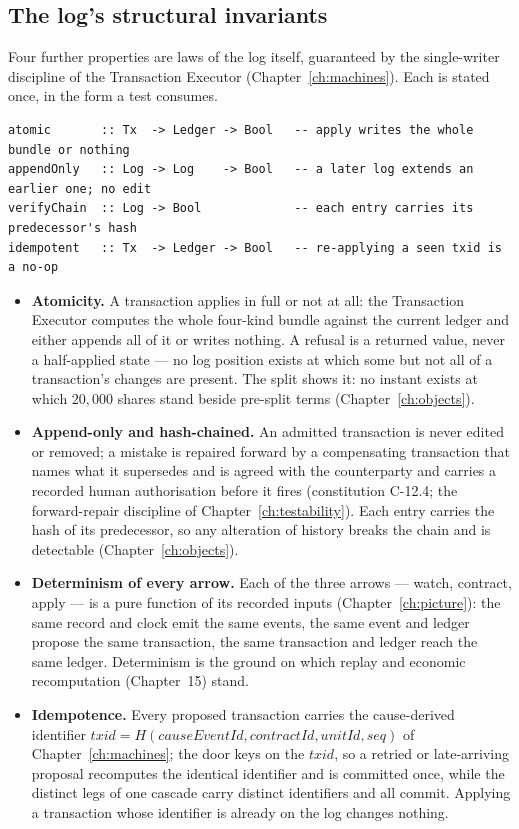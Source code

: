 \documentclass[11pt,a4paper]{article}
\begin{document}
\subsection{The log's structural invariants}

Four further properties are laws of the log itself, guaranteed by the
single-writer discipline of the Transaction Executor (Chapter~\ref{ch:machines}).
Each is stated once, in the form a test consumes.

\begin{lstlisting}
atomic       :: Tx  -> Ledger -> Bool   -- apply writes the whole bundle or nothing
appendOnly   :: Log -> Log    -> Bool   -- a later log extends an earlier one; no edit
verifyChain  :: Log -> Bool             -- each entry carries its predecessor's hash
idempotent   :: Tx  -> Ledger -> Bool   -- re-applying a seen txid is a no-op
\end{lstlisting}

\begin{itemize}[leftmargin=1.4em,itemsep=2pt]
\item \textbf{Atomicity.} A transaction applies in full or not at all: the
  Transaction Executor computes the whole four-kind bundle against the current
  ledger and either appends all of it or writes nothing. A refusal is a returned
  value, never a half-applied state --- no log position exists at which some but
  not all of a transaction's changes are present. The split shows it: no instant
  exists at which $20{,}000$ shares stand beside pre-split terms
  (Chapter~\ref{ch:objects}).
\item \textbf{Append-only and hash-chained.} An admitted transaction is never
  edited or removed; a mistake is repaired forward by a compensating transaction that
  names what it supersedes and is agreed with the counterparty and carries a recorded human
  authorisation before it fires
  (constitution C-12.4; the forward-repair discipline of Chapter~\ref{ch:testability}).
  Each entry carries the hash of its predecessor, so
  any alteration of history breaks the chain and is detectable
  (Chapter~\ref{ch:objects}).
\item \textbf{Determinism of every arrow.} Each of the three arrows --- watch,
  contract, apply --- is a pure function of its recorded inputs
  (Chapter~\ref{ch:picture}): the same record and clock emit the same events, the
  same event and ledger propose the same transaction, the same transaction and
  ledger reach the same ledger. Determinism is the ground on which replay and
  economic recomputation (Chapter~15) stand.
\item \textbf{Idempotence.} Every proposed transaction carries the cause-derived
  identifier $\mathit{txid}=H(\mathit{causeEventId},\mathit{contractId},\mathit{unitId},\mathit{seq})$
  of Chapter~\ref{ch:machines}; the door keys on the $\mathit{txid}$, so a retried or
  late-arriving proposal recomputes the identical identifier and is committed once,
  while the distinct legs of one cascade carry distinct identifiers and all commit.
  Applying a transaction whose identifier is already on the log changes nothing.
\end{itemize}
\end{document}
